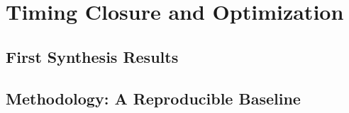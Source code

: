 %
\chapter{Timing Closure and Optimization}
\label{chap:timing}

\section{First Synthesis Results}
\label{sec:first-synth}

\section{Methodology: A Reproducible Baseline}
\label{sec:timing-method}

